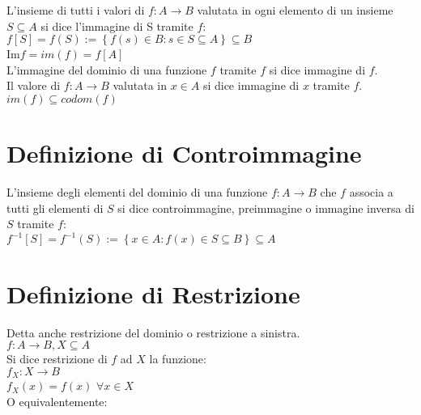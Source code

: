 \documentclass[a4paper, twoside, italian, 11pt]{book}
\newcommand{\braces}[1] {\left\{#1\right\}}
\begin{document}
L'insieme di tutti i valori di $f : A \rightarrow B$ valutata in ogni elemento di un insieme $S \subseteq A$ si dice l'immagine di S tramite $f$: \\

$f[S] = f(S) := \braces{f(s) \in B : s \in S \subseteq A} \subseteq B$ \\

Im$f = im(f) = f[A]$ \\

\noindent
L'immagine del dominio di una funzione $f$ tramite $f$ si dice immagine di $f$.\\

\noindent
Il valore di $f : A \rightarrow B$ valutata in $x \in A$ si dice immagine di $x$ tramite $f$. \\

\noindent
$im(f) \subseteq codom(f)$



\section{Definizione di Controimmagine}

L'insieme degli elementi del dominio di una funzione $f : A \rightarrow B$ che $f$ associa a tutti gli elementi di $S$ si dice controimmagine, preimmagine o immagine inversa di $S$ tramite $f$: \\

$f^{-1}[S] = f^{-1}(S) := \braces{x \in A : f(x) \in S \subseteq B} \subseteq A$



\section{Definizione di Restrizione}

Detta anche restrizione del dominio o restrizione a sinistra. \\

\noindent
$f : A \rightarrow B, X \subseteq A$ \\

\noindent
Si dice restrizione di $f$ ad $X$ la funzione: \\

$f_X : X \rightarrow B$ \\
\indent
$f_X(x) = f(x)$ $\forall x \in X$ \\

\noindent
O equivalentemente: \\
\end{document}
